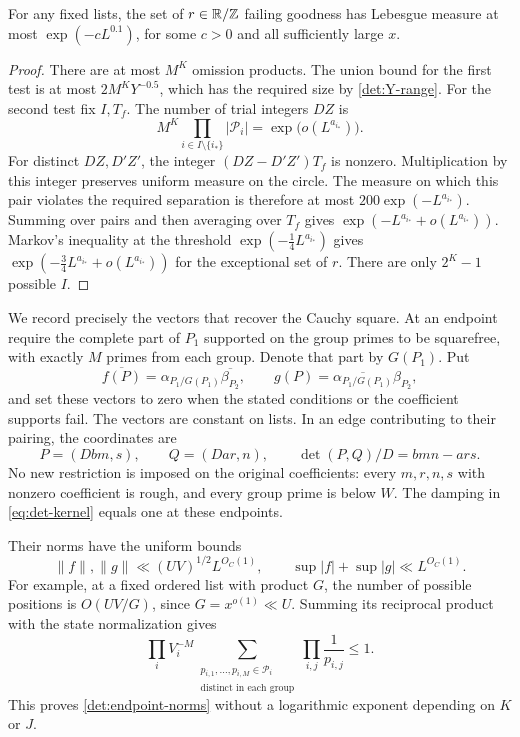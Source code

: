 \begin{lemma}\label{det:good-state}
For any fixed lists, the set of $r\in\mathbb R/\mathbb Z$ failing goodness has
Lebesgue measure at most $\exp(-cL^{0.1})$, for some $c>0$ and
all sufficiently large $x$.
\end{lemma}
\begin{proof}
There are at most $M^K$ omission products.  The union bound for
the first test is at most $2M^KY^{-0.5}$, which has the required
size by \eqref{det:Y-range}.  For the second test fix $I,T_f$.
The number of trial integers $DZ$ is
\[
 M^K\prod_{i\in I\setminus\{i_*\}}|\mathcal P_i|
          =\exp\bigl(o(L^{a_{i_*}})\bigr).
\]
For distinct $DZ,D'Z'$, the integer
$(DZ-D'Z')T_f$ is nonzero.  Multiplication by this integer
preserves uniform measure on the circle.  The measure on which
this pair violates the required separation is therefore at most
$200\exp(-L^{a_{i_*}})$.  Summing over pairs and then averaging
over $T_f$ gives $\exp(-L^{a_{i_*}}+o(L^{a_{i_*}}))$.
Markov's inequality at the threshold
$\exp(-\tfrac14L^{a_{i_*}})$ gives
$\exp(-\tfrac34L^{a_{i_*}}+o(L^{a_{i_*}}))$ for the exceptional
set of $r$.  There are only $2^K-1$ possible $I$.
\end{proof}

We record precisely the vectors that recover the Cauchy square.
At an endpoint require the complete part of $P_1$ supported on
the group primes to be squarefree, with exactly $M$ primes from
each group.  Denote that part by $G(P_1)$.  Put
\begin{equation}\label{det:endpoints}
 \overline{f(P)}=\alpha_{P_1/G(P_1)}\overline{\beta_{P_2}},
 \qquad
 g(P)=\overline{\alpha_{P_1/G(P_1)}}\beta_{P_2},
\end{equation}
and set these vectors to zero when the stated conditions or the
coefficient supports fail.  The vectors are constant on lists.
In an edge contributing to their pairing, the coordinates are
\begin{equation}\label{det:lift}
 P=(Dbm,s),\qquad Q=(Dar,n),\qquad
 \det(P,Q)/D=bmn-ars.
\end{equation}
No new restriction is imposed on the original coefficients:
every $m,r,n,s$ with nonzero coefficient is rough, and every
group prime is below $W$.  The damping in
\eqref{eq:det-kernel} equals one at these endpoints.

Their norms have the uniform bounds
\begin{equation}\label{det:endpoint-norms}
 \|f\|,\|g\|\ll(UV)^{1/2}L^{O_C(1)},\qquad
 \sup|f|+\sup|g|\ll L^{O_C(1)}.
\end{equation}
For example, at a fixed ordered list with product $G$, the number
of possible positions is $O(UV/G)$, since $G=x^{o(1)}\ll U$.
Summing its reciprocal product with the state normalization gives
\[
 \prod_i V_i^{-M}
 \sum_{\substack{p_{i,1},\ldots,p_{i,M}\in\mathcal P_i\\
                  \text{distinct in each group}}}
             \prod_{i,j}\frac1{p_{i,j}}\leq1.
\]
This proves \eqref{det:endpoint-norms} without a logarithmic
exponent depending on $K$ or $J$.

